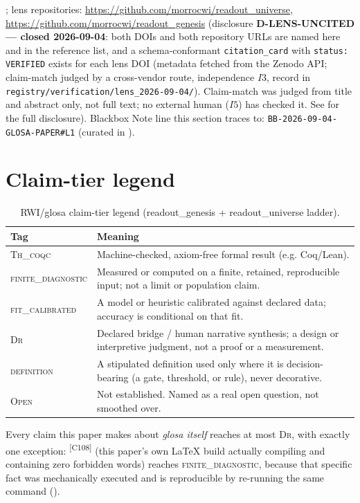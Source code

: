 \documentclass[11pt]{article}
\newcommand{\ThCoqc}{\textsc{Th\_coqc}}
\newcommand{\FiniteDiag}{\textsc{finite\_diagnostic}}
\newcommand{\FitCal}{\textsc{fit\_calibrated}}
\newcommand{\DrTier}{\textsc{Dr}}
\newcommand{\DefTier}{\textsc{definition}}
\newcommand{\OpenTier}{\textsc{Open}}
\newcommand{\claimref}[1]{\textsuperscript{[#1]}}
\begin{document}
\citep{lahtee2026genesis,lahtee2026zeroreadout}; lens repositories:
\url{https://github.com/morrocwi/readout_universe},
\url{https://github.com/morrocwi/readout_genesis} (disclosure \textbf{D-LENS-UNCITED --- closed
2026-09-04}: both DOIs and both repository URLs are named here and in the reference list, and a
schema-conformant \texttt{citation\_card} with \texttt{status: VERIFIED} exists for each lens DOI
(metadata fetched from the Zenodo API; claim-match judged by a cross-vendor route, independence
$I3$, record in \texttt{registry/verification/lens\_2026-09-04/}). Claim-match was judged from
title and abstract only, not full text; no external human ($I5$) has checked it.
See  for the full disclosure).
Blackbox Note line this section traces to: \texttt{BB-2026-09-04-GLOSA-PAPER\#L1} (curated in
).

\section{Claim-tier legend}
\label{sec:tiers}
\begin{table}[H]
\centering
\small
\begin{tabularx}{\linewidth}{@{}l X@{}}
\toprule
\textbf{Tag} & \textbf{Meaning} \\
\midrule
\ThCoqc{} & Machine-checked, axiom-free formal result (e.g. Coq/Lean). \\
\FiniteDiag{} & Measured or computed on a finite, retained, reproducible input; not a limit or population claim. \\
\FitCal{} & A model or heuristic calibrated against declared data; accuracy is conditional on that fit. \\
\DrTier{} & Declared bridge / human narrative synthesis; a design or interpretive judgment, not a proof or a measurement. \\
\DefTier{} & A stipulated definition used only where it is decision-bearing (a gate, threshold, or rule), never decorative. \\
\OpenTier{} & Not established. Named as a real open question, not smoothed over. \\
\bottomrule
\end{tabularx}
\caption{RWI/glosa claim-tier legend (readout\_genesis + readout\_universe ladder).}
\label{tab:tiers}
\end{table}
Every claim this paper makes about \emph{glosa itself} reaches at most \DrTier{}, with exactly one
exception: \claimref{C108} (this paper's own LaTeX build actually compiling and containing zero
forbidden words) reaches \FiniteDiag{}, because that specific fact was mechanically executed and
is reproducible by re-running the same command ().
\end{document}
